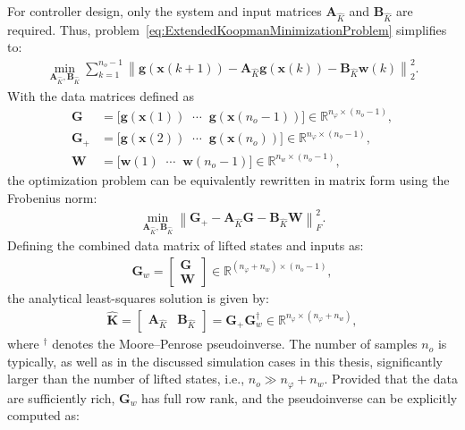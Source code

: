 For controller design, only the system and input matrices $\bm{A}_{\hat{K}}$ and $\bm{B}_{\hat{K}}$ are required. Thus, problem~\eqref{eq:ExtendedKoopmanMinimizationProblem} simplifies to:
\begin{align}
    \min_{\bm{A}_{\hat{K}}, \bm{B}_{\hat{K}}} 
    \sum_{k=1}^{n_o-1} 
    \left\| \bm{g}(\bm{x}(k+1)) - \bm{A}_{\hat{K}} \bm{g}(\bm{x}(k)) - \bm{B}_{\hat{K}} \bm{w}(k) \right\|_2^2.
    \label{eq:ApproxKoopman}
\end{align}
%
With the data matrices defined as
\begin{align}\label{eq:G_Gplus_datamatrices}
    \bm{G} &= \bigl[ \bm{g}(\bm{x}(1)) \;\; \cdots \;\; \bm{g}(\bm{x}(n_o-1)) \bigr] \in \mathbb{R}^{n_\varphi \times (n_o-1)}, \\
    \bm{G}_{+} &= \bigl[ \bm{g}(\bm{x}(2)) \;\; \cdots \;\; \bm{g}(\bm{x}(n_o)) \bigr] \in \mathbb{R}^{n_\varphi \times (n_o-1)}, \\
    \bm{W} &= \bigl[ \bm{w}(1) \;\; \cdots \;\; \bm{w}(n_o-1) \bigr] \in \mathbb{R}^{n_w \times (n_o-1)},
\end{align}
the optimization problem can be equivalently rewritten in matrix form using the Frobenius norm:
\begin{align}
    \min_{\bm{A}_{\hat{K}}, \bm{B}_{\hat{K}}} 
    \left\| \bm{G}_{+} - \bm{A}_{\hat{K}} \bm{G} - \bm{B}_{\hat{K}} \bm{W} \right\|_F^2.
\end{align}
Defining the combined data matrix of lifted states and inputs as:
\begin{align}
    \bm{G}_w = \begin{bmatrix} \bm{G} \\ \bm{W} \end{bmatrix} \in \mathbb{R}^{(n_\varphi + n_w)\times (n_o-1)},
\end{align}
the analytical least-squares solution is given by:
\begin{align}\label{eq:Koop_G_Gplus_datamatrices}
    \hat{\bm{K}} = \begin{bmatrix} \bm{A}_{\hat{K}} & \bm{B}_{\hat{K}} \end{bmatrix} 
    = \bm{G}_{+}  \bm{G}_w^{\dagger}
    \in \mathbb{R}^{n_\varphi \times (n_\varphi + n_w)},
\end{align}
where ${}^\dagger$ denotes the Moore–Penrose pseudoinverse.  The number of samples $n_o$ is typically, as well as in the discussed simulation cases in this thesis, significantly larger than the number of lifted states, i.e., $n_o \gg n_\varphi + n_w$. Provided that the data are sufficiently rich,  $\bm{G}_w$ has full row rank, and the pseudoinverse can be explicitly computed as:
